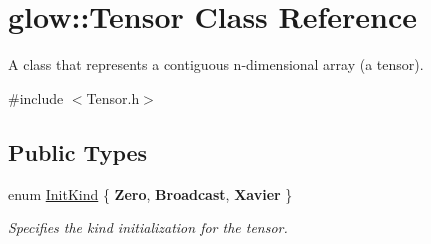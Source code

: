 \hypertarget{classglow_1_1_tensor}{}\section{glow\+:\+:Tensor Class Reference}
\label{classglow_1_1_tensor}


A class that represents a contiguous n-\/dimensional array (a tensor).  




{\ttfamily \#include $<$Tensor.\+h$>$}

\subsection*{Public Types}
\begin{DoxyCompactItemize}
\item 
\mbox{\label{classglow_1_1_tensor_a20209a68c0539dfff33c065fe8358073}} 
enum \hyperlink{classglow_1_1_tensor_a20209a68c0539dfff33c065fe8358073}{Init\+Kind} \{ {\bfseries Zero}, 
{\bfseries Broadcast}, 
{\bfseries Xavier}
 \}\begin{DoxyCompactList}\small\item\em Specifies the kind initialization for the tensor. \end{DoxyCompactList}
\end{DoxyCompactItemize}
